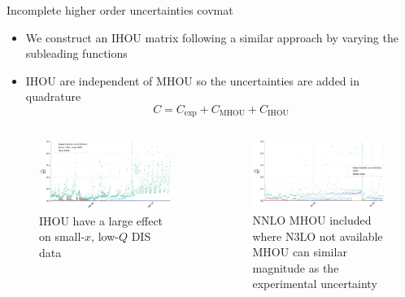 \begin{frame}{Incomplete higher order uncertainties covmat}
  \begin{itemize}
    \item We construct an IHOU matrix following a similar approach by varying the subleading functions
    \item IHOU are independent of MHOU so the uncertainties are added in quadrature
    $$C = C_\mathrm{exp}+C_\mathrm{MHOU}+C_\mathrm{IHOU}$$
  \end{itemize}

  \begin{columns}
    \begin{column}{0.49\textwidth}
      \begin{figure}[!t]
        \centering
        \includegraphics[width=.9\textwidth]{figures/diag_cov_dis_ihou.pdf}
        \caption*{IHOU have a large effect on small-$x$, low-$Q$ DIS data
        }
      \end{figure}
    \end{column}
    \begin{column}{0.49\textwidth}
      \begin{figure}[!t]
        \centering
        \includegraphics[width=.9\textwidth]{figures/diag_cov_dy_ihou_3pt_mhou.pdf}
        \caption*{NNLO MHOU included where N3LO not available \\
          MHOU can similar magnitude as the experimental uncertainty
        }
      \end{figure}
    \end{column}
  \end{columns}


\end{frame}



